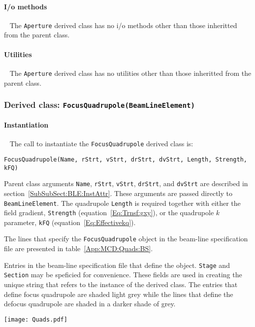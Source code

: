 \FloatBarrier

\paragraph{I/o methods} ~\newline
\noindent
The \texttt{Aperture} derived class has no i/o methods other than
those inheritted from the parent class.

\paragraph{Utilities} ~\newline
\noindent
The \texttt{Aperture} derived class has no utilities other than those
inheritted from the parent class. 

\subsubsection{Derived class: \texttt{FocusQuadrupole(BeamLineElement)}}

\paragraph{Instantiation} ~\newline
\noindent
The call to instantiate the \texttt{FocusQuadrupole} derived class is:
\begin{center}
  \texttt{FocusQuadrupole(Name, rStrt, vStrt, drStrt, dvStrt, Length,
          Strength, kFQ)} 
\end{center}
Parent class arguments \texttt{Name}, \texttt{rStrt}, \texttt{vStrt},
\texttt{drStrt}, and \texttt{dvStrt} are described in
section~\ref{SubSubSect:BLE:InstAttr}.
These arguments are passed directly to \texttt{BeamLineElement}.
The quadrupole \texttt{Length} is required together with
either the field gradient, \texttt{Strength}
(equation~\ref{Eq:Trnsf:gxy}), or the quadrupole $k$
parameter, \texttt{kFQ} (equation~\ref{Eq:Effectivekq}).

The lines that specify the \texttt{FocusQuadrupole} object in the
beam-line specification file are presented in
table~\ref{App:MCD:Quads:BS}. 
\begin{table}[h]
  \caption{
    Entries in the beam-line specification file that define the
    object.
    \texttt{Stage} and \texttt{Section} may be speficied for
    convenience.
    These fields are used in creating the unique string that refers
    to the instance of the derived class.
    The entries that define focus quadrupole are shaded light grey
    while the lines that define the defocus quadrupole are shaded in a
    darker shade of grey.
  }
  \label{App:MCD:Quads:BS}
  \begin{center}
    \texttt{[image: Quads.pdf]}
  \end{center}
\end{table}

